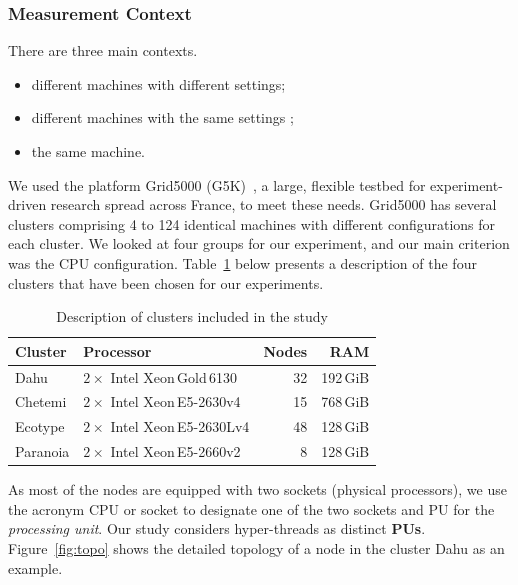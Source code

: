 \subsubsection{Measurement Context}
There are three main contexts.
\begin{itemize}
    \item different machines with different settings;
    \item different machines with the same settings ;
    \item the same machine.
\end{itemize}

We used the platform Grid5000 (G5K)~\cite{grid5000,margery:hal-00965708}, a large, flexible testbed for experiment-driven research spread across France, to meet these needs. Grid5000 has several clusters comprising 4 to 124 identical machines with different configurations for each cluster. We looked at four groups for our experiment, and our main criterion was the CPU configuration.
Table~\ref{table:g5k} below presents a description of the four clusters that have been chosen for our experiments.

\begin{table}[hbt]
    \centering
    \caption{Description of clusters included in the study}
    \label{table:g5k}
    \small
    \begin{tabular}{|l|l|r|r|}
        \hline
        \textbf{Cluster}  & \textbf{Processor}               & \textbf{Nodes} & \textbf{RAM} \\
        \hline
        \hline
        \textsf{Dahu}     & $2\times$ Intel Xeon\,Gold\,6130 & 32             & 192\,GiB     \\
        \hline
        \textsf{Chetemi}  & $2\times$ Intel Xeon\,E5-2630v4  & 15             & 768\,GiB     \\
        \hline
        \textsf{Ecotype}  & $2\times$ Intel Xeon\,E5-2630Lv4 & 48             & 128\,GiB     \\
        \hline
        \textsf{Paranoia} & $2\times$ Intel Xeon\,E5-2660v2  & 8              & 128\,GiB     \\
        \hline
    \end{tabular}
\end{table}

As most of the nodes are equipped with two sockets (physical processors), we use the acronym \textsf{CPU} or \textsf{socket} to designate one of the two sockets and \textsf{PU} for the \emph{processing unit}.
Our study considers hyper-threads as distinct \textbf{PUs}.
Figure~\ref{fig:topo} shows the detailed topology of a node in the cluster \textsf{Dahu} as an example.

